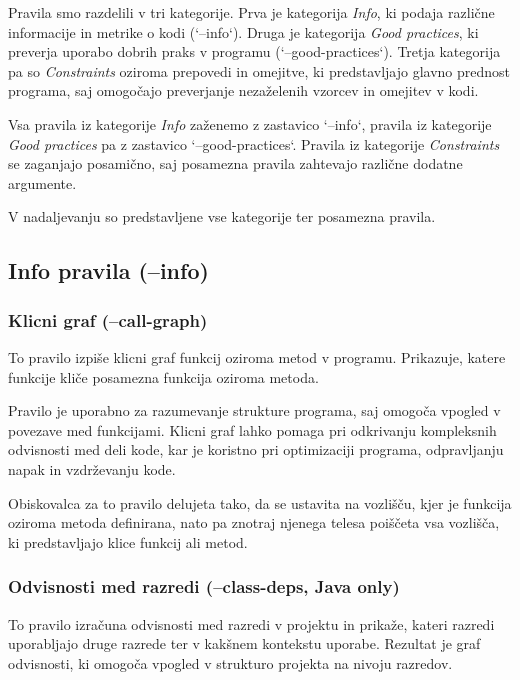 \documentclass[a4paper,12pt,openright]{book}
\begin{document}
Pravila smo razdelili v tri kategorije. Prva je kategorija \textit{Info}, ki podaja različne informacije in metrike o kodi (`--info`). Druga je kategorija \textit{Good practices}, ki preverja uporabo dobrih praks v programu (`--good-practices`). Tretja kategorija pa so \textit{Constraints} oziroma prepovedi in omejitve, ki predstavljajo glavno prednost programa, saj omogočajo preverjanje nezaželenih vzorcev in omejitev v kodi.

Vsa pravila iz kategorije \textit{Info} zaženemo z zastavico `--info`, pravila iz kategorije \textit{Good practices} pa z zastavico `--good-practices`. Pravila iz kategorije \textit{Constraints} se zaganjajo posamično, saj posamezna pravila zahtevajo različne dodatne argumente.

V nadaljevanju so predstavljene vse kategorije ter posamezna pravila.

\subsection{Info pravila (--info)}

\subsubsection{Klicni graf (--call-graph)}

To pravilo izpiše klicni graf funkcij oziroma metod v programu. Prikazuje, katere funkcije kliče posamezna funkcija oziroma metoda.

Pravilo je uporabno za razumevanje strukture programa, saj omogoča vpogled v povezave med funkcijami. Klicni graf lahko pomaga pri odkrivanju kompleksnih odvisnosti med deli kode, kar je koristno pri optimizaciji programa, odpravljanju napak in vzdrževanju kode.

Obiskovalca za to pravilo delujeta tako, da se ustavita na vozlišču, kjer je funkcija oziroma metoda definirana, nato pa znotraj njenega telesa poiščeta vsa vozlišča, ki predstavljajo klice funkcij ali metod.

\subsubsection{Odvisnosti med razredi (--class-deps, Java only)}

To pravilo izračuna odvisnosti med razredi v projektu in prikaže, kateri razredi uporabljajo druge razrede ter v kakšnem kontekstu uporabe. Rezultat je graf odvisnosti, ki omogoča vpogled v strukturo projekta na nivoju razredov.
\end{document}
